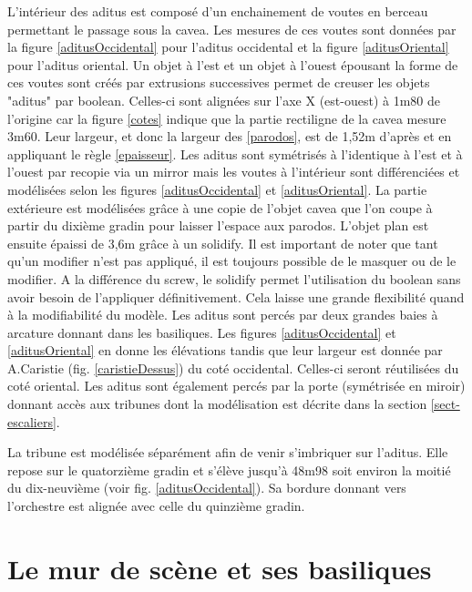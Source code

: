 L'intérieur des aditus est composé d'un enchainement de voutes en berceau permettant le passage sous la cavea. Les mesures de ces voutes sont données par la figure \ref{aditusOccidental} pour l'aditus occidental et la figure \ref{aditusOriental} pour l'aditus oriental. Un objet à l'est et un objet à l'ouest épousant la forme de ces voutes sont créés par extrusions successives permet de creuser les objets "aditus" par \gls{boolean}. Celles-ci sont alignées sur l'axe X (est-ouest) à 1m80 de l'origine car la figure \ref{cotes} indique que la partie rectiligne de la cavea mesure 3m60. Leur largeur, et donc la largeur des \ref{parodos}, est de 1,52m d'après \cite[Pl. XXI]{orangePl} et en appliquant le règle \ref{epaisseur}. Les aditus sont symétrisés à l'identique à l'est et à l'ouest par recopie via un \gls{mirror} mais les voutes à l'intérieur sont différenciées et modélisées selon les figures \ref{aditusOccidental} et \ref{aditusOriental}. La partie extérieure est modélisées grâce à une copie de l'objet cavea que l'on coupe à partir du dixième gradin pour laisser l'espace aux \gls{parodos}. L'objet plan est ensuite épaissi de 3,6m grâce à un \gls{solidify}. Il est important de noter que tant qu'un modifier n'est pas appliqué, il est toujours possible de le masquer ou de le modifier. A la différence du \gls{screw}, le \gls{solidify} permet l'utilisation du \gls{boolean} sans avoir besoin de l'appliquer définitivement. Cela laisse une grande flexibilité quand à la modifiabilité du modèle. Les aditus sont percés par deux grandes baies à arcature donnant dans les basiliques. Les figures \ref{aditusOccidental} et \ref{aditusOriental} en donne les élévations tandis que leur largeur est donnée par A.Caristie (fig. \ref{caristieDessus}) du coté occidental. Celles-ci seront réutilisées du coté oriental. Les aditus sont également percés par la porte (symétrisée en miroir) donnant accès aux tribunes dont la modélisation est décrite dans la section \ref{sect-escaliers}.

La tribune est modélisée séparément afin de venir s'imbriquer sur l'aditus. Elle repose sur le quatorzième gradin et s'élève jusqu'à 48m98 soit environ la moitié du dix-neuvième (voir fig. \ref{aditusOccidental}). Sa bordure donnant vers l'orchestre est alignée avec celle du quinzième gradin.

\section{Le mur de scène et ses basiliques} 
\label{mur}


